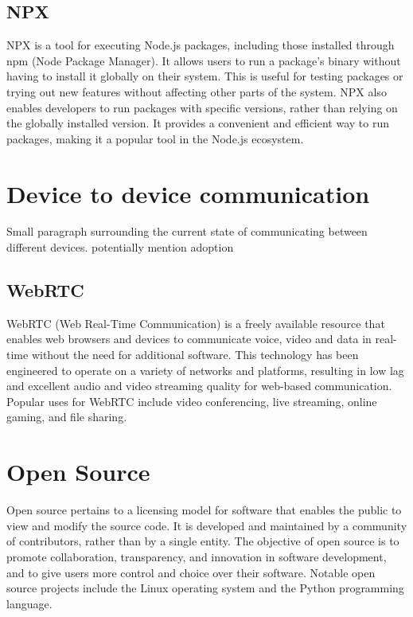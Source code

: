 \documentclass{l4proj}
\begin{document}
\subsection{NPX}
\text NPX is a tool for executing Node.js packages, including those installed through npm (Node Package Manager). It allows users to run a package's binary without having to install it globally on their system. This is useful for testing packages or trying out new features without affecting other parts of the system. NPX also enables developers to run packages with specific versions, rather than relying on the globally installed version. It provides a convenient and efficient way to run packages, making it a popular tool in the Node.js ecosystem.

\section{Device to device communication}

Small paragraph surrounding the current state of communicating between different devices. potentially mention adoption 

\subsection{WebRTC}
\text WebRTC (Web Real-Time Communication) is a freely available resource that enables web browsers and devices to communicate voice, video and data in real-time without the need for additional software. This technology has been engineered to operate on a variety of networks and platforms, resulting in low lag and excellent audio and video streaming quality for web-based communication. Popular uses for WebRTC include video conferencing, live streaming, online gaming, and file sharing.

\section{Open Source}
\text Open source pertains to a licensing model for software that enables the public to view and modify the source code. It is developed and maintained by a community of contributors, rather than by a single entity. The objective of open source is to promote collaboration, transparency, and innovation in software development, and to give users more control and choice over their software. Notable open source projects include the Linux operating system and the Python programming language.
\end{document}
